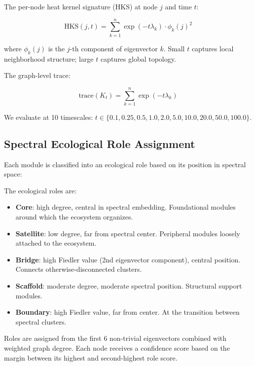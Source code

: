 \documentclass{../yalumba}
\begin{document}
The per-node heat kernel signature (HKS) at node $j$ and time $t$:

\begin{equation}
  \text{HKS}(j, t) = \sum_{k=1}^{n} \exp(-t \lambda_k) \cdot \phi_k(j)^2
  \label{eq:hks}
\end{equation}

where $\phi_k(j)$ is the $j$-th component of eigenvector $k$.  Small $t$
captures local neighborhood structure; large $t$ captures global topology.


The graph-level trace:

\begin{equation}
  \text{trace}(K_t) = \sum_{k=1}^{n} \exp(-t \lambda_k)
  \label{eq:trace}
\end{equation}

We evaluate at 10 timescales: $t \in \{0.1, 0.25, 0.5, 1.0, 2.0, 5.0, 10.0,
20.0, 50.0, 100.0\}$.

\subsection{Spectral Ecological Role Assignment}

Each module is classified into an ecological role based on its position in
spectral space:

\begin{definition}
The ecological roles are:
\begin{itemize}
  \item \textbf{Core}: high degree, central in spectral embedding.  Foundational
    modules around which the ecosystem organizes.
  \item \textbf{Satellite}: low degree, far from spectral center.  Peripheral
    modules loosely attached to the ecosystem.
  \item \textbf{Bridge}: high Fiedler value (2nd eigenvector component),
    central position.  Connects otherwise-disconnected clusters.
  \item \textbf{Scaffold}: moderate degree, moderate spectral position.
    Structural support modules.
  \item \textbf{Boundary}: high Fiedler value, far from center.  At the
    transition between spectral clusters.
\end{itemize}
\end{definition}

Roles are assigned from the first 6 non-trivial eigenvectors combined with
weighted graph degree.  Each node receives a confidence score based on the
margin between its highest and second-highest role score.
\end{document}
